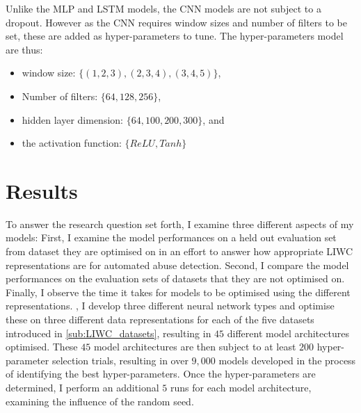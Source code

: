   
Unlike the MLP and LSTM models, the CNN models are not subject to a dropout.  
However as the CNN requires window sizes and number of filters to be set, these are added as hyper-parameters to tune. The hyper-parameters  model are thus:  
  
\begin{itemize}  
  \item window size: $\{(1, 2, 3), (2, 3, 4), (3, 4, 5)\}$,  
  \item Number of filters: $\{64, 128, 256\}$,  
  \item hidden layer dimension: $\{64, 100, 200, 300\}$, and  
  \item the activation function: $\{ReLU, Tanh\}$  
\end{itemize}  
  
\section{Results}  
To answer the research question set forth, I examine three different aspects of my models:   
First, I examine the model performances on a held out evaluation set from dataset they are optimised on in an effort to answer how appropriate LIWC representations are for automated abuse detection.  
Second, I compare the model performances on the evaluation sets of datasets that they are not optimised on.  
Finally, I observe the time it takes for models to be optimised using the different representations.  
, I develop three different neural network types and optimise these on three different data representations for each of the five datasets introduced in \cref{sub:LIWC_datasets}, resulting in $45$ different model architectures optimised.  
These $45$ model architectures are then subject to at least $200$ hyper-parameter selection trials, resulting in over $9,000$ models developed in the process of identifying the best hyper-parameters.  
Once the hyper-parameters are determined, I perform an additional $5$ runs for each model architecture, examining the influence of the random seed.  
  
